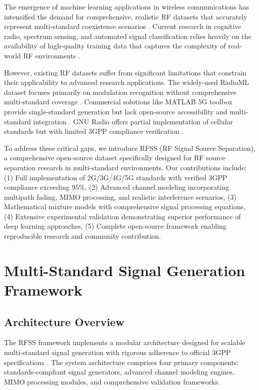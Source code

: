 \documentclass[twocolumn]{article}
\begin{document}
The emergence of machine learning applications in wireless communications has intensified the demand for comprehensive, realistic RF datasets that accurately represent multi-standard coexistence scenarios \cite{oshea2017introduction,west2017deep}. Current research in cognitive radio, spectrum sensing, and automated signal classification relies heavily on the availability of high-quality training data that captures the complexity of real-world RF environments \cite{oshea2018over,oshea2016convolutional,rajendran2018deep}.

However, existing RF datasets suffer from significant limitations that constrain their applicability to advanced research applications. The widely-used RadioML dataset focuses primarily on modulation recognition without comprehensive multi-standard coverage \cite{oshea2016radio}. Commercial solutions like MATLAB 5G toolbox provide single-standard generation but lack open-source accessibility and multi-standard integration \cite{west2017deep}. GNU Radio offers partial implementation of cellular standards but with limited 3GPP compliance verification \cite{blossom2004gnu}.

To address these critical gaps, we introduce RFSS (RF Signal Source Separation), a comprehensive open-source dataset specifically designed for RF source separation research in multi-standard environments. Our contributions include: (1) Full implementation of 2G/3G/4G/5G standards with verified 3GPP compliance exceeding 95\%, (2) Advanced channel modeling incorporating multipath fading, MIMO processing, and realistic interference scenarios, (3) Mathematical mixture models with comprehensive signal processing equations, (4) Extensive experimental validation demonstrating superior performance of deep learning approaches, (5) Complete open-source framework enabling reproducible research and community contribution.

\section{Multi-Standard Signal Generation Framework}

\subsection{Architecture Overview}

The RFSS framework implements a modular architecture designed for scalable multi-standard signal generation with rigorous adherence to official 3GPP specifications \cite{3gpp2018ts45004,3gpp2018ts25211,3gpp2018ts36211,3gpp2020ts38211}. The system architecture comprises four primary components: standards-compliant signal generators, advanced channel modeling engines, MIMO processing modules, and comprehensive validation frameworks.
\end{document}
